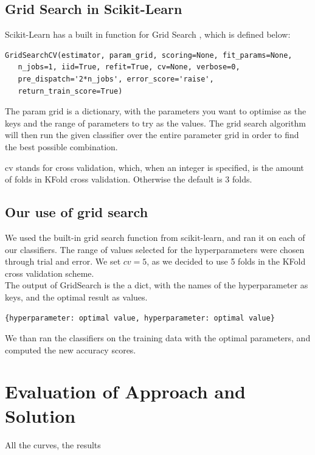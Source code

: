 \documentclass{article}
\begin{document}
	\subsection{Grid Search in Scikit-Learn}
	
		Scikit-Learn has a built in function for Grid Search \cite{gridsearch}, which is defined below:
		
		
	\begin{lstlisting}
GridSearchCV(estimator, param_grid, scoring=None, fit_params=None, 
   n_jobs=1, iid=True, refit=True, cv=None, verbose=0, 
   pre_dispatch='2*n_jobs', error_score='raise',
   return_train_score=True)
	\end{lstlisting}
		
		The param \textunderscore grid is a dictionary, with the parameters you want to optimise as the keys and the range of parameters to try as the values. The grid search algorithm will then run the given classifier over the entire parameter grid in order to find the best possible combination. 
		
	cv stands for cross validation, which, when an integer is specified, is the amount of folds in KFold cross validation. Otherwise the default is 3 folds. 

		
\subsection{Our use of grid search}

		We used the built-in grid search function from scikit-learn, and ran it on each of our classifiers. The range of values selected for the hyperparameters were chosen through trial and error. We set $cv=5$, as we decided to use 5 folds in the KFold cross validation scheme. 
\\

		
		The output of GridSearch is the a dict, with the names of the hyperparameter as keys, and the optimal result as values. 
		
		\begin{lstlisting}
{hyperparameter: optimal value, hyperparameter: optimal value}
		\end{lstlisting}

	We than ran the classifiers on the training data with the optimal parameters, and computed the new accuracy scores. 

\newpage

\section{Evaluation of Approach and Solution} 
	All the curves, the results
\end{document}
